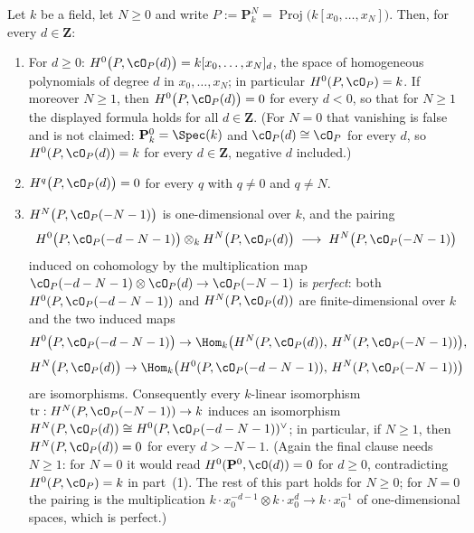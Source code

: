 \begin{lemma}
\label{lem:pc-cohomology-twists-projective-space}
Let $k$ be a field, let $N\ge0$ and write
$P:=\mathbf P^N_k=\operatorname{Proj}\bigl(k[x_0,\dots,x_N]\bigr)$.
Then, for every $d\in\mathbf Z$:
\begin{enumerate}
\item For $d\ge0$: $H^0\bigl(P,\cO_P(d)\bigr)=k[x_0,\dots,x_N]_d$, the
space of homogeneous polynomials of degree $d$ in $x_0,\dots,x_N$; in
particular $H^0(P,\cO_P)=k$.  If moreover $N\ge1$, then
$H^0\bigl(P,\cO_P(d)\bigr)=0$ for every $d<0$, so that for $N\ge1$ the
displayed formula holds for all $d\in\mathbf Z$.  (For $N=0$ that
vanishing is false and is not claimed: $\mathbf P^0_k=\Spec(k)$ and
$\cO_P(d)\cong\cO_P$ for every $d$, so $H^0(P,\cO_P(d))=k$ for every
$d\in\mathbf Z$, negative $d$ included.)
\item $H^q\bigl(P,\cO_P(d)\bigr)=0$ for every $q$ with $q\ne0$ and
$q\ne N$.
\item $H^N\bigl(P,\cO_P(-N-1)\bigr)$ is one-dimensional over $k$, and
the pairing
\[
H^0\bigl(P,\cO_P(-d-N-1)\bigr)\otimes_kH^N\bigl(P,\cO_P(d)\bigr)
\;\longrightarrow\;H^N\bigl(P,\cO_P(-N-1)\bigr)
\]
induced on cohomology by the multiplication map
$\cO_P(-d-N-1)\otimes\cO_P(d)\to\cO_P(-N-1)$ is \emph{perfect}: both
$H^0(P,\cO_P(-d-N-1))$ and $H^N(P,\cO_P(d))$ are finite-dimensional
over $k$ and the two induced maps
\[
H^0\bigl(P,\cO_P(-d-N-1)\bigr)\to
\Hom_k\bigl(H^N(P,\cO_P(d)),\,H^N(P,\cO_P(-N-1))\bigr),
\]
\[
H^N\bigl(P,\cO_P(d)\bigr)\to
\Hom_k\bigl(H^0(P,\cO_P(-d-N-1)),\,H^N(P,\cO_P(-N-1))\bigr)
\]
are isomorphisms.  Consequently every $k$-linear isomorphism
$\operatorname{tr}:H^N(P,\cO_P(-N-1))\to k$ induces an isomorphism
$H^N(P,\cO_P(d))\cong H^0(P,\cO_P(-d-N-1))^{\vee}$; in particular, if
$N\ge1$, then $H^N(P,\cO_P(d))=0$ for every $d>-N-1$.  (Again the
final clause needs $N\ge1$: for $N=0$ it would read
$H^0(\mathbf P^0,\cO(d))=0$ for $d\ge0$, contradicting
$H^0(P,\cO_P)=k$ in part~(1).  The rest of this part holds for
$N\ge0$; for $N=0$ the pairing is the multiplication
$k\cdot x_0^{-d-1}\otimes k\cdot x_0^{d}\to k\cdot x_0^{-1}$ of
one-dimensional spaces, which is perfect.)
\end{enumerate}
\end{lemma}
